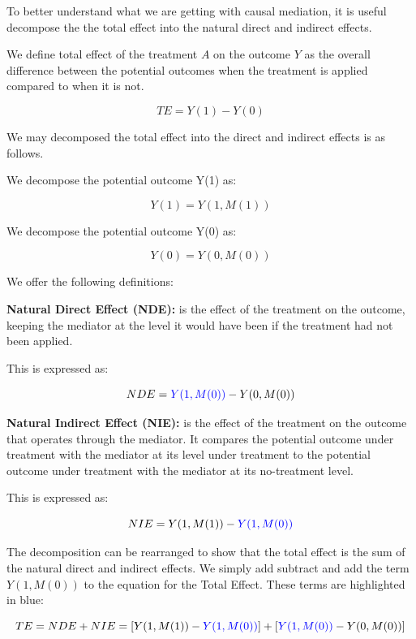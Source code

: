 \documentclass[
  singlecolumn,
  9pt]{article}
\begin{document}
To better understand what we are getting with causal mediation, it is
useful decompose the the total effect into the natural direct and
indirect effects.

We define total effect of the treatment \(A\) on the outcome \(Y\) as
the overall difference between the potential outcomes when the treatment
is applied compared to when it is not.

\[
TE = Y(1) - Y(0)
\]

We may decomposed the total effect into the direct and indirect effects
is as follows.

We decompose the potential outcome Y(1) as:

\[ 
Y(1) = Y(1, M(1))
\]

We decompose the potential outcome Y(0) as:

\[ 
Y(0) = Y(0, M(0))
\]

We offer the following definitions:

\textbf{Natural Direct Effect (NDE):} is the effect of the treatment on
the outcome, keeping the mediator at the level it would have been if the
treatment had not been applied.

This is expressed as:

\[
 NDE = \textcolor{blue}{Y(1, M(0))} - Y(0, M(0))
 \]

\textbf{Natural Indirect Effect (NIE):} is the effect of the treatment
on the outcome that operates through the mediator. It compares the
potential outcome under treatment with the mediator at its level under
treatment to the potential outcome under treatment with the mediator at
its no-treatment level.

This is expressed as:

\[
 NIE = Y(1, M(1)) - \textcolor{blue}{Y(1, M(0))}
 \]

The decomposition can be rearranged to show that the total effect is the
sum of the natural direct and indirect effects. We simply add subtract
and add the term \(Y(1, M(0))\) to the equation for the Total Effect.
These terms are highlighted in blue:

\[
TE = NDE + NIE = [Y(1, M(1)) - \textcolor{blue}{Y(1, M(0))}] + [\textcolor{blue}{Y(1, M(0))} - Y(0, M(0))]
\]
\end{document}
